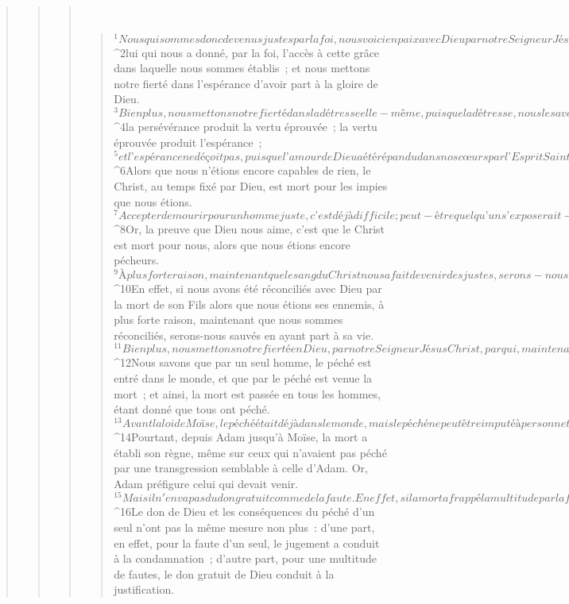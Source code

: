 \begin{verse}
\begin{verse}
\begin{verse}
         
      \bchapter{}
      \begin{verse}
${}^{1}Nous qui sommes donc devenus justes par la foi, nous voici en paix avec Dieu par notre Seigneur Jésus Christ, 
${}^{2}lui qui nous a donné, par la foi, l’accès à cette grâce dans laquelle nous sommes établis ; et nous mettons notre fierté dans l’espérance d’avoir part à la gloire de Dieu. 
${}^{3}Bien plus, nous mettons notre fierté dans la détresse elle-même, puisque la détresse, nous le savons, produit la persévérance ; 
${}^{4}la persévérance produit la vertu éprouvée ; la vertu éprouvée produit l’espérance ; 
${}^{5}et l’espérance ne déçoit pas, puisque l’amour de Dieu a été répandu dans nos cœurs par l’Esprit Saint qui nous a été donné.
${}^{6}Alors que nous n’étions encore capables de rien, le Christ, au temps fixé par Dieu, est mort pour les impies que nous étions. 
${}^{7}Accepter de mourir pour un homme juste, c’est déjà difficile ; peut-être quelqu’un s’exposerait-il à mourir pour un homme de bien. 
${}^{8}Or, la preuve que Dieu nous aime, c’est que le Christ est mort pour nous, alors que nous étions encore pécheurs. 
${}^{9}À plus forte raison, maintenant que le sang du Christ nous a fait devenir des justes, serons-nous sauvés par lui de la colère de Dieu. 
${}^{10}En effet, si nous avons été réconciliés avec Dieu par la mort de son Fils alors que nous étions ses ennemis, à plus forte raison, maintenant que nous sommes réconciliés, serons-nous sauvés en ayant part à sa vie. 
${}^{11}Bien plus, nous mettons notre fierté en Dieu, par notre Seigneur Jésus Christ, par qui, maintenant, nous avons reçu la réconciliation.
${}^{12}Nous savons que par un seul homme, le péché est entré dans le monde, et que par le péché est venue la mort ; et ainsi, la mort est passée en tous les hommes, étant donné que tous ont péché. 
${}^{13}Avant la loi de Moïse, le péché était déjà dans le monde, mais le péché ne peut être imputé à personne tant qu’il n’y a pas de loi. 
${}^{14}Pourtant, depuis Adam jusqu’à Moïse, la mort a établi son règne, même sur ceux qui n’avaient pas péché par une transgression semblable à celle d’Adam. Or, Adam préfigure celui qui devait venir.
${}^{15}Mais il n'en va pas du don gratuit comme de la faute. En effet, si la mort a frappé la multitude par la faute d’un seul, combien plus la grâce de Dieu s’est-elle répandue en abondance sur la multitude, cette grâce qui est donnée en un seul homme, Jésus Christ. 
${}^{16}Le don de Dieu et les conséquences du péché d’un seul n’ont pas la même mesure non plus : d’une part, en effet, pour la faute d’un seul, le jugement a conduit à la condamnation ; d’autre part, pour une multitude de fautes, le don gratuit de Dieu conduit à la justification. 

\end{verse}
\end{verse}
\end{verse}
\end{verse}
